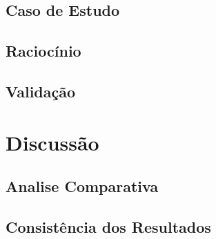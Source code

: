 \documentclass[openright]{normas-utf-tex} %
\begin{document}
	\section{Caso de Estudo} \label{studycase}


			

	\section{Raciocínio} \label{rac}


			
	
	\section{Validação} \label{validation}

			

\chapter{Discussão}

	

	\section{Analise Comparativa}\label{analisecomparativa}

		\label{analisecomparativa}

		
		
		
		
		
	
		
	
		
	
		

		
		
		
		
		

	\section{Consistência dos Resultados}\label{constresult}
\end{document}
